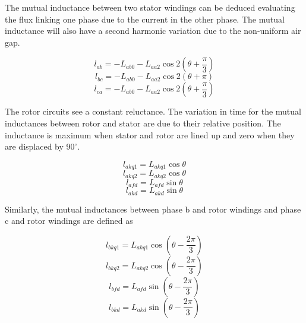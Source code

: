The mutual inductance between two stator windings can be deduced evaluating the flux linking one phase due to the current in the other phase. The mutual inductance will also have a second harmonic variation due to the non-uniform air gap.

\begin{equation} \label{eq:MutualInductanceAB}
	l_{ab} = -L_{ab0} - L_{aa2} \cos 2(\theta + \frac{\pi}{3})
\end{equation}
\begin{equation} \label{eq:MutualInductanceBC}
	l_{bc} = -L_{ab0} - L_{aa2} \cos 2(\theta + \pi)
\end{equation}
\begin{equation} \label{eq:MutualInductanceCA}
	l_{ca} = - L_{ab0} - L_{aa2} \cos 2(\theta + \frac{\pi}{3})
\end{equation}

The rotor circuits see a constant reluctance. The variation in time for the mutual inductances between rotor and stator are due to their relative position. The inductance is maximum when stator and rotor are lined up and zero when they are displaced by $90^{\circ}$.

\begin{equation}
	l_{akq1} = L_{akq1} \cos \theta
\end{equation}
\begin{equation}
	l_{akq2} = L_{akq2} \cos \theta
\end{equation}
\begin{equation}
	l_{afd} = L_{afd} \sin \theta
\end{equation}
\begin{equation}
	l_{akd} = L_{akd} \sin \theta
\end{equation}

Similarly, the mutual inductances between phase b and rotor windings and phase c and rotor windings are defined as

\begin{equation}
	l_{bkq1} = L_{akq1} \cos (\theta - \dfrac{2 \pi}{3})
\end{equation}
\begin{equation}
	l_{bkq2} = L_{akq2} \cos (\theta - \dfrac{2 \pi}{3})
\end{equation}
\begin{equation}
	l_{bfd} = L_{afd} \sin (\theta - \dfrac{2 \pi}{3})
\end{equation}
\begin{equation}
	l_{bkd} = L_{akd} \sin (\theta - \dfrac{2 \pi}{3})
\end{equation}

